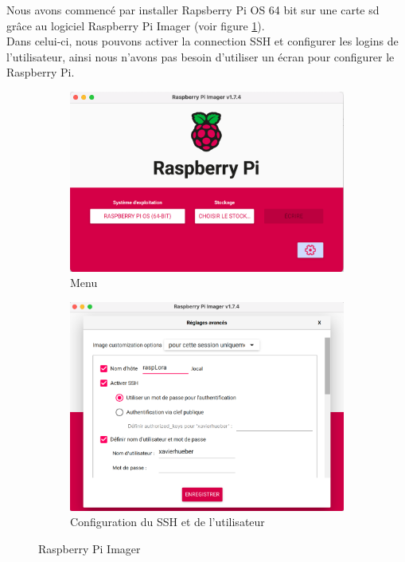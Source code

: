 \documentclass{article}
\begin{document}
				Nous avons commencé par installer Rapsberry Pi OS 64 bit sur une carte sd grâce au logiciel Raspberry Pi Imager (voir figure \ref{fig:raspberrypiimager}).\\
				Dans celui-ci, nous pouvons activer la connection SSH et configurer les logins de l'utilisateur, ainsi nous n'avons pas besoin d'utiliser un écran pour configurer le Raspberry Pi.
				\begin{figure}[H]
					\centering
					\begin{subfigure}{0.49\textwidth}
						\centering
						\includegraphics[width=\linewidth]{raspberrypi_imager}
						\caption{Menu}
						\label{fig:raspberrypiimager}
					\end{subfigure}
					\begin{subfigure}{0.49\textwidth}
						\centering
						\includegraphics[width=\linewidth]{raspberrypi_imager1}
						\caption{Configuration du SSH et de l'utilisateur}
						\label{fig:raspberrypiimager1}
					\end{subfigure}
					\caption{Raspberry Pi Imager}
				\end{figure}
\end{document}
